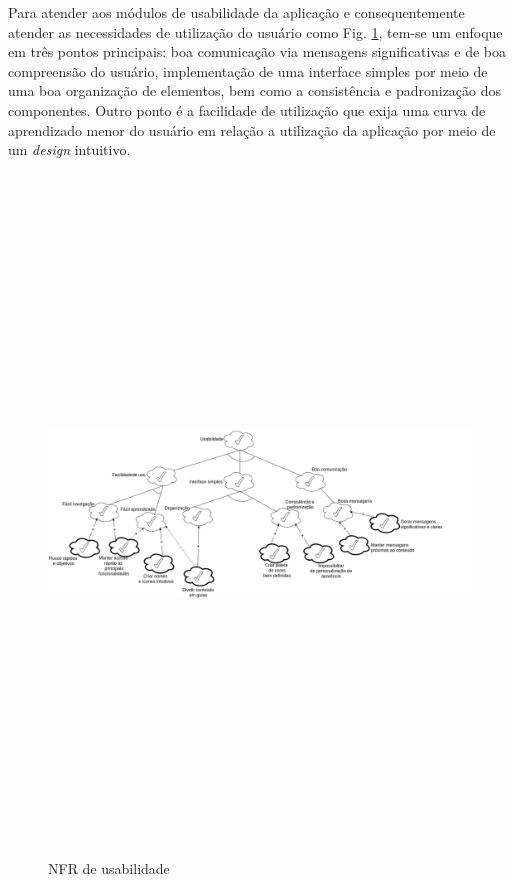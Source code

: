 Para atender aos módulos de usabilidade da aplicação e consequentemente atender as necessidades de utilização do usuário como Fig. \ref{fig:nfr-usabilidade}, tem-se um enfoque em três pontos principais: boa comunicação via mensagens significativas e de boa compreensão do usuário, implementação de uma interface simples por meio de uma boa organização de elementos, bem como a consistência e padronização dos componentes. Outro ponto é a facilidade de utilização que exija uma curva de aprendizado menor do usuário em relação a utilização da aplicação por meio de um \textit{design} intuitivo.

\begin{figure}[H]
    \centering
    \includegraphics[width=14cm, height=18cm, keepaspectratio]{figuras/software/NFR/NFR_usabilidade.png}
    \caption{NFR de usabilidade}
    \label{fig:nfr-usabilidade}
\end{figure}

